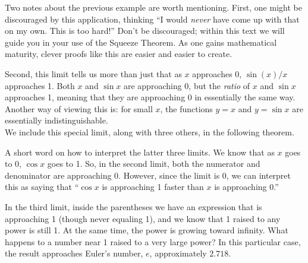 Two notes about the previous example are worth mentioning. First, one might be discouraged by this application, thinking ``I would \textit{never} have come up with that on my own. This is too hard!'' Don't be discouraged; within this text we will guide you in your use of the Squeeze Theorem. As one gains mathematical maturity, clever proofs like this are easier and easier to create.

Second, this limit tells us more than just that as $x$ approaches 0, $\sin(x)/x$ approaches 1. Both $x$ and $\sin x$ are approaching 0, but the \textit{ratio} of $x$ and $\sin x$ approaches 1, meaning that they are approaching 0 in essentially the same way. Another way of viewing this is: for small $x$, the functions $y=x$ and $y=\sin x$ are essentially indistinguishable.\\

We include this special limit, along with three others, in the following theorem.


A short word on how to interpret the latter three limits. We know that as $x$ goes to 0, $\cos x$ goes to 1. So, in the second limit, both the numerator and denominator are approaching 0. However, since the limit is 0, we can interpret this as saying that ``$\cos x$ is approaching 1 faster than $x$ is approaching 0.''

In the third limit, inside the parentheses we have an expression that is approaching 1 (though never equaling 1), and we know that 1 raised to any power is still 1. At the same time, the power is growing toward infinity. What happens to a number near 1 raised to a very large power? In this particular case, the result approaches Euler's number, $e$, approximately $2.718.$

